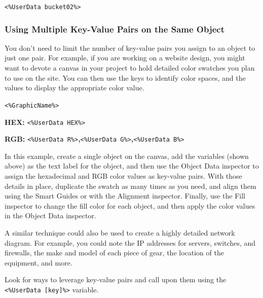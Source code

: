 \documentclass[../main.tex]{subfiles}
\begin{document}
\begin{ogpro}
  \texttt{<\%UserData bucket02\%>}


  \subsubsection{Using Multiple Key-Value Pairs on the Same Object}

  You don't need to limit the number of key-value pairs you assign to an object to just one
  pair. For example, if you are working on a website design, you might want to devote a canvas
  in your project to hold detailed color swatches you plan to use on the site. You can then
  use the keys to identify color spaces, and the values to display the appropriate color
  value.


  \begin{description}[style=nextline]
    \item[{The variables used as the object labels are as follows:}] \texttt{<\%GraphicName\%>}
    \item[{}] \textbf{HEX:} \texttt{<\%UserData HEX\%>}
    \item[{}] \textbf{RGB:} \texttt{<\%UserData R\%>}\textbf{,}\texttt{<\%UserData
      G\%>}\textbf{,}\texttt{<\%UserData B\%>}
  \end{description}

  In this example, create a single object on the canvas, add the variables (shown above) as the
  text label for the object, and then use the Object Data inspector to assign the hexadecimal
  and RGB color values as key-value pairs. With those details in place, duplicate the swatch
  as many times as you need, and align them using the Smart Guides or with the Alignment
  inspector. Finally, use the Fill inspector to change the fill color for each object, and
  then apply the color values in the Object Data inspector.

  A similar technique could also be used to create a highly detailed network diagram. For
  example, you could note the IP addresses for servers, switches, and firewalls, the make and
  model of each piece of gear, the location of the equipment, and more.

  Look for ways to leverage key-value pairs and call upon them using the \texttt{<\%UserData
  [key]\%>} variable.
\end{ogpro}
\end{document}
